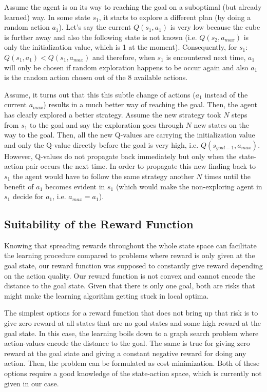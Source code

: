 Assume the agent is on its way to reaching the goal on a suboptimal (but already learned) way. In some state $s_1$, it starts to explore a different plan (by doing a random action $a_1$). Let's say the current $Q(s_1, a_1)$  is very low because the cube is further away and also the following state is not known (i.e. $Q(s_2, a_{max})$ is only the initialization value, which is 1 at the moment). Consequently, for $s_1$: $Q(s_1, a_1) < Q(s_1, a_{max})$ and therefore, when $s_1$ is encountered next time, $a_1$  will only be chosen if random exploration happens to be occur again and also $a_1$ is the random action chosen out of the 8 available actions.

Assume, it turns out that this this subtle change of actions ($a_1$ instead of the current $a_{max}$) results in a much better way of reaching the goal. Then, the agent has clearly explored a better strategy. 
Assume the new strategy took $N$ steps from $s_1$ to the goal and say the exploration goes through $N$ new states on the way to the goal. Then, all the new Q-values are carrying the initialization value and only the Q-value directly before the goal is very high, i.e. $Q(s_{goal - 1}, a_{max})$.
However, Q-values do not propagate back immediately but only when the state-action pair occurs the next time. In order to propagate this new finding back to $s_1$ the agent would have to follow the same strategy another $N$ times until the benefit of $a_1$ becomes evident in $s_1$ (which would make the non-exploring agent in $s_1$ decide for $a_1$, i.e. $a_{max} = a_1$).

\subsection{Suitability of the Reward Function}
Knowing that spreading rewards throughout the whole state space can facilitate the learning procedure compared to problems where reward is only given at the goal state, our reward function was supposed to constantly give reward depending on the action quality. Our reward function is not convex and cannot encode the distance to the goal state. Given that there is only one goal, both are risks that might make the learning algorithm getting stuck in local optima.

The simplest options for a reward function that does not bring up that risk is to give zero reward at all states that are no goal states and some high reward at the goal state. In this case, the learning boils down to a graph search problem where action-values encode the distance to the goal. The same is true for giving zero reward at the goal state and giving a constant negative reward for doing any action. Then, the problem can be formulated as cost minimization. Both of these options require a good knowledge of the state-action space, which is currently not given in our case.

